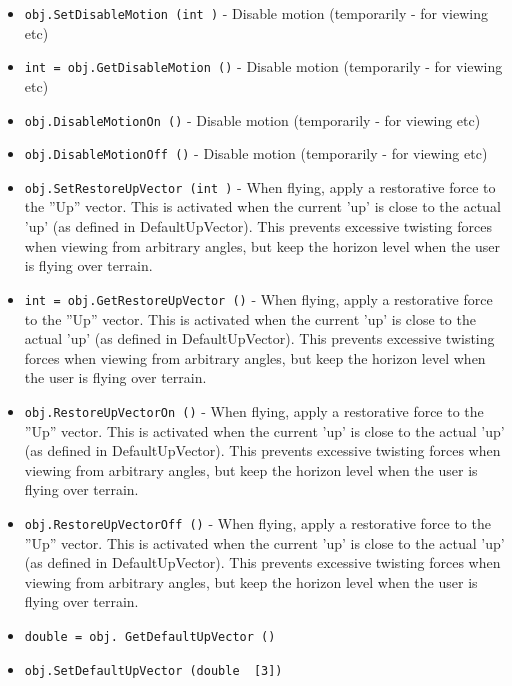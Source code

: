 \begin{itemize}
\item  \verb|obj.SetDisableMotion (int )| -  Disable motion (temporarily - for viewing etc)

\item  \verb|int = obj.GetDisableMotion ()| -  Disable motion (temporarily - for viewing etc)

\item  \verb|obj.DisableMotionOn ()| -  Disable motion (temporarily - for viewing etc)

\item  \verb|obj.DisableMotionOff ()| -  Disable motion (temporarily - for viewing etc)

\item  \verb|obj.SetRestoreUpVector (int )| -  When flying, apply a restorative force to the ''Up'' vector.
 This is activated when the current 'up' is close to the actual 'up'
 (as defined in DefaultUpVector). This prevents excessive twisting forces
 when viewing from arbitrary angles, but keep the horizon level when
 the user is flying over terrain.

\item  \verb|int = obj.GetRestoreUpVector ()| -  When flying, apply a restorative force to the ''Up'' vector.
 This is activated when the current 'up' is close to the actual 'up'
 (as defined in DefaultUpVector). This prevents excessive twisting forces
 when viewing from arbitrary angles, but keep the horizon level when
 the user is flying over terrain.

\item  \verb|obj.RestoreUpVectorOn ()| -  When flying, apply a restorative force to the ''Up'' vector.
 This is activated when the current 'up' is close to the actual 'up'
 (as defined in DefaultUpVector). This prevents excessive twisting forces
 when viewing from arbitrary angles, but keep the horizon level when
 the user is flying over terrain.

\item  \verb|obj.RestoreUpVectorOff ()| -  When flying, apply a restorative force to the ''Up'' vector.
 This is activated when the current 'up' is close to the actual 'up'
 (as defined in DefaultUpVector). This prevents excessive twisting forces
 when viewing from arbitrary angles, but keep the horizon level when
 the user is flying over terrain.

\item  \verb|double = obj. GetDefaultUpVector ()|

\item  \verb|obj.SetDefaultUpVector (double  [3])|


\end{itemize}
